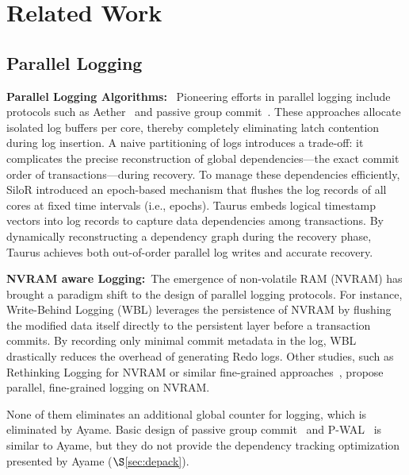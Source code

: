 \section{Related Work}
\label{sec:related}
\subsection{Parallel Logging}
\noindent
\textbf{Parallel Logging Algorithms:}~ Pioneering efforts in parallel logging include protocols such as Aether~\cite{aether} and passive group commit~\cite{wang2014nvm}. These approaches allocate isolated log buffers per core, thereby completely eliminating latch contention during log insertion. 
%
A naive partitioning of logs introduces a trade-off: it complicates the precise reconstruction of global dependencies—the exact commit order of transactions—during recovery. To manage these dependencies efficiently, SiloR \cite{zheng2014silor} introduced an epoch-based mechanism that flushes the log records of all cores at fixed time intervals (i.e., epochs). 
Taurus \cite{xia2021taurus} embeds logical timestamp vectors into log records to capture data dependencies among transactions. By dynamically reconstructing a dependency graph during the recovery phase, Taurus achieves both out-of-order parallel log writes and accurate recovery.
%

\noindent
\textbf{NVRAM aware Logging:}~The emergence of non-volatile RAM (NVRAM) has brought a paradigm shift to the design of parallel logging protocols. %
%
For instance, Write-Behind Logging (WBL) \cite{wbl} leverages the persistence of NVRAM by flushing the modified data itself directly to the persistent layer before a transaction commits. By recording only minimal commit metadata in the log, WBL drastically reduces the overhead of generating Redo logs. Other studies, such as Rethinking Logging for NVRAM \cite{rethinking} or similar fine-grained approaches~\cite{IPL}, propose parallel, fine-grained logging on NVRAM.

None of them eliminates an additional global counter for logging, which is eliminated by Ayame. 
%
Basic design of passive group commit~\cite{wang2014nvm} and P-WAL~\cite{kamiya2017pwal} is similar to Ayame, but they do not provide the dependency tracking optimization presented by Ayame ($\S$\ref{sec:depack}).


